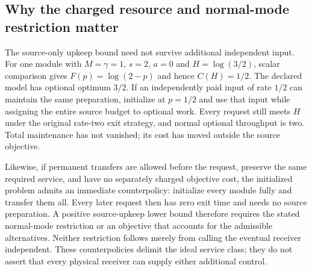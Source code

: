 \subsection{Why the charged resource and normal-mode restriction matter}

The source-only upkeep bound need not survive additional independent input.
For one module with $M=\gamma=1$, $s=2$, $a=0$ and $H=\log(3/2)$,
scalar comparison gives $F(p)=\log(2-p)$ and hence $C(H)=1/2$.
The declared model has optional optimum $3/2$. If an independently paid input
of rate $1/2$ can maintain the same preparation, initialize at $p=1/2$ and
use that input while assigning the entire source budget to optional work.
Every request still meets $H$ under the original rate-two exit strategy, and
normal optional throughput is two. Total maintenance has not vanished; its
cost has moved outside the source objective.

Likewise, if permanent transfers are allowed before the request, preserve
the same required service, and have no separately charged objective cost,
the initialized problem admits an immediate counterpolicy: initialize every
module fully and transfer them all. Every later request then has zero exit
time and needs no source preparation. A positive source-upkeep lower bound
therefore requires the stated normal-mode restriction or an objective that
accounts for the admissible alternatives. Neither restriction follows merely
from calling the eventual receiver independent. These counterpolicies delimit
the ideal service class; they do not assert that every physical receiver can
supply either additional control.

